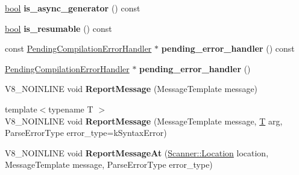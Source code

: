\begin{DoxyCompactItemize}
\item 
\mbox{\label{classv8_1_1internal_1_1ParserBase_a64f4ef0a9727905e72deefc8a011e3a5}} 
\mbox{\hyperlink{classbool}{bool}} {\bfseries is\+\_\+async\+\_\+generator} () const
\item 
\mbox{\label{classv8_1_1internal_1_1ParserBase_aa7f9595658d9ba49231181d89f4bd653}} 
\mbox{\hyperlink{classbool}{bool}} {\bfseries is\+\_\+resumable} () const
\item 
\mbox{\label{classv8_1_1internal_1_1ParserBase_af8b24769abe00fdf75aea10e8d9f579c}} 
const \mbox{\hyperlink{classv8_1_1internal_1_1PendingCompilationErrorHandler}{Pending\+Compilation\+Error\+Handler}} $\ast$ {\bfseries pending\+\_\+error\+\_\+handler} () const
\item 
\mbox{\label{classv8_1_1internal_1_1ParserBase_a4fc335a419fe41647f50fc09a9e84f12}} 
\mbox{\hyperlink{classv8_1_1internal_1_1PendingCompilationErrorHandler}{Pending\+Compilation\+Error\+Handler}} $\ast$ {\bfseries pending\+\_\+error\+\_\+handler} ()
\item 
\mbox{\label{classv8_1_1internal_1_1ParserBase_aa7ae4471db0a5abcfb2c57a060e11df8}} 
V8\+\_\+\+N\+O\+I\+N\+L\+I\+NE void {\bfseries Report\+Message} (Message\+Template message)
\item 
\mbox{\label{classv8_1_1internal_1_1ParserBase_a3dbf614180e9aa7d29088ca3e13a476a}} 
{\footnotesize template$<$typename T $>$ }\\V8\+\_\+\+N\+O\+I\+N\+L\+I\+NE void {\bfseries Report\+Message} (Message\+Template message, \mbox{\hyperlink{classv8_1_1internal_1_1torque_1_1T}{T}} arg, Parse\+Error\+Type error\+\_\+type=k\+Syntax\+Error)
\item 
\mbox{\label{classv8_1_1internal_1_1ParserBase_afa678cdda82c4b8a8b132e50173164ef}} 
V8\+\_\+\+N\+O\+I\+N\+L\+I\+NE void {\bfseries Report\+Message\+At} (\mbox{\hyperlink{structv8_1_1internal_1_1Scanner_1_1Location}{Scanner\+::\+Location}} location, Message\+Template message, Parse\+Error\+Type error\+\_\+type)
\item 

\end{DoxyCompactItemize}
